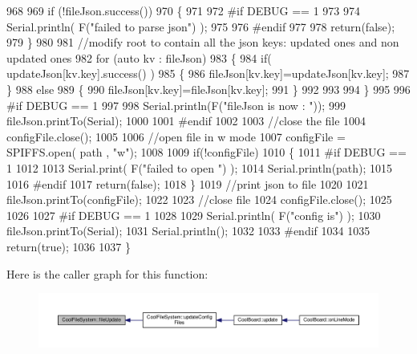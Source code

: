 \begin{DoxyCode}
968 
969     \textcolor{keywordflow}{if} (!fileJson.success())
970     \{
971 
972 \textcolor{preprocessor}{    #if DEBUG == 1}
973 
974         Serial.println( F(\textcolor{stringliteral}{"failed to parse json"}) );
975 
976 \textcolor{preprocessor}{    #endif}
977 
978         \textcolor{keywordflow}{return}(\textcolor{keyword}{false});
979     \}
980     
981     \textcolor{comment}{//modify root to contain all the json keys: updated ones and non updated ones}
982     \textcolor{keywordflow}{for} (\textcolor{keyword}{auto} kv : fileJson) 
983     \{
984         \textcolor{keywordflow}{if}( updateJson[kv.key].success() )
985         \{
986             fileJson[kv.key]=updateJson[kv.key];            
987         \}
988         \textcolor{keywordflow}{else}
989         \{
990             fileJson[kv.key]=fileJson[kv.key];
991         \}
992 
993                 
994     \}
995 
996 \textcolor{preprocessor}{#if DEBUG == 1}
997 
998     Serial.println(F(\textcolor{stringliteral}{"fileJson is now : "}));
999     fileJson.printTo(Serial);
1000 
1001 \textcolor{preprocessor}{#endif}
1002 
1003     \textcolor{comment}{//close the file}
1004     configFile.close();
1005 
1006     \textcolor{comment}{//open file in w mode}
1007     configFile = SPIFFS.open( path , \textcolor{stringliteral}{"w"});
1008     
1009     \textcolor{keywordflow}{if}(!configFile)
1010     \{   
1011 \textcolor{preprocessor}{    #if DEBUG == 1}
1012         
1013         Serial.print( F(\textcolor{stringliteral}{"failed to open "}) );
1014         Serial.println(path);
1015 
1016 \textcolor{preprocessor}{    #endif}
1017         \textcolor{keywordflow}{return}(\textcolor{keyword}{false});
1018     \}
1019     \textcolor{comment}{//print json to file    }
1020     
1021     fileJson.printTo(configFile);
1022     
1023     \textcolor{comment}{//close file}
1024     configFile.close();
1025 
1026 
1027 \textcolor{preprocessor}{#if DEBUG == 1}
1028 
1029     Serial.println( F(\textcolor{stringliteral}{"config is"}) );
1030     fileJson.printTo(Serial);
1031     Serial.println();
1032 
1033 \textcolor{preprocessor}{#endif}
1034     
1035     \textcolor{keywordflow}{return}(\textcolor{keyword}{true});
1036     
1037 \}
\end{DoxyCode}
Here is the caller graph for this function\+:
\nopagebreak
\begin{figure}[H]
\begin{center}
\leavevmode
\includegraphics[width=350pt]{classCoolFileSystem_a13f2958f5b87757c31fc53797a30d23a_icgraph}
\end{center}
\end{figure}
\mbox{\label{classCoolFileSystem_a5c58bca3735c0ed3efb268d70ef998ef}} 
